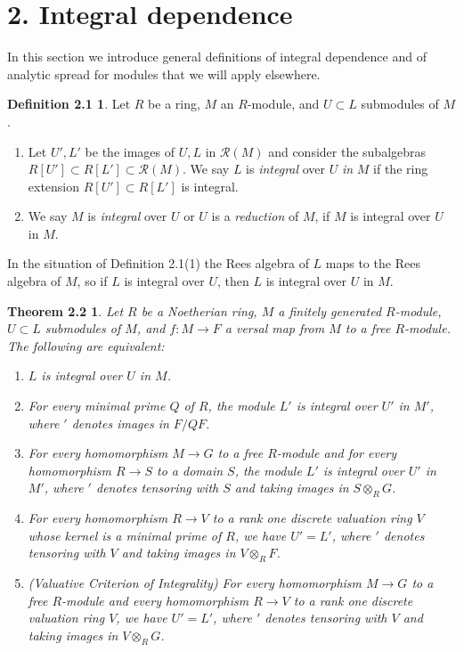 \documentclass{proc-l}
\theoremstyle{plain}
\newtheorem*{theorem8}{Theorem 2.2}
\theoremstyle{definition}
\newtheorem*{definition5}{Definition 2.1}
\newcommand{\R}{\mathcal R}
\newcommand{\ra}{\rightarrow }
\begin{document}
\section*{2. Integral dependence}

In this section we introduce general definitions of integral
dependence and of analytic spread for modules that we will apply
elsewhere.

\begin{definition5}  Let $R$ be a ring, $M$
an $R$-module, and $U \subset L$ submodules of $M$. \begin{enumerate}

\item Let $U',L'$ be the images of $U,L$ in ${\R }(M)$ and consider
the subalgebras $R[U'] \subset R[L']\subset {\R }(M)$.  We say $L$
is {\em integral} over $U$ {\em in} $M$ if the ring extension
$R[U'] \subset R[L']$ is integral.
\item We say $M$ is {\em integral} over $U$ or $U$ is a {\em reduction} of
$M$, if $M$ is integral over $U$ in $M$.
\end{enumerate}\end{definition5}

In the situation of Definition 2.1(1) the Rees algebra of $L$ maps
to the Rees algebra of $M$, so if $L$ is integral over $U$, 
then $L$ is integral over $U$ in $M$.

\begin{theorem8}  Let $R$ be a Noetherian ring, $M$ a
finitely generated $R$-module, $U \subset L$ submodules of $M$,
and $f \colon M \ra F$ a versal map from $M$ to a free
$R$-module.  The following are equivalent: \begin{enumerate}
\item $L$ is integral over $U$ in $M$.
\item For every minimal prime $Q$ of $R$, the module
$L'$ is integral over $U'$ in $M'$, where $'$ denotes images in
$F/QF$.
\item For every homomorphism
$M\to G$ to a free $R$-module and for every homomorphism $R \ra S$
to a domain $S$, the module $L'$ is integral over $U'$ in $M'$,
where $'$ denotes tensoring with $S$ and taking images in
$S\otimes _{R}G$.
\item For every homomorphism $R \ra V$ to a rank one discrete valuation
ring $V$ whose kernel is a minimal prime of $R$, we have $U' =
L'$, where $'$
denotes tensoring with $V$ and taking images in $V\otimes _{R}F$.
\item (Valuative Criterion of Integrality)
For every homomorphism $M\to G$ to a free $R$-module and every
homomorphism $R \ra V$ to a rank one discrete valuation ring $V$,
we have $U' = L'$, where $'$ denotes tensoring with $V$ and taking
images in $V\otimes _{R}G$.
\end{enumerate}\end{theorem8}
\end{document}
